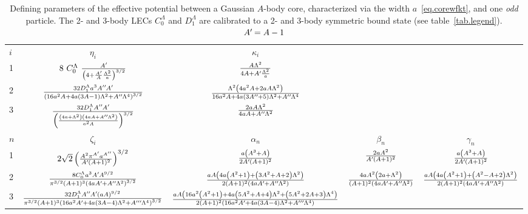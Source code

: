 \documentclass[aps,prd,onecolumn
,tightenlines,letterpaper,
notitlepage,11pt,
nofootinbib]{revtex4-1}
\newcommand*{\mprime}{^{\prime}\mkern-1.2mu}
\newcommand*{\mdprime}{^{\prime\prime}\mkern-1.2mu}
\newcommand*{\mtprime}{^{\prime\prime\prime}\mkern-1.2mu}
\begin{document}
\begin{sidewaystable}
\setlength{\tabcolsep}{4pt}
\renewcommand{\arraystretch}{2.4}
\caption{\label{tab.rgmpot}{Defining parameters of the effective potential between
a Gaussian $A$-body core, characterized via the width $a$~\eqref{eq.corewfkt},
and one {\it odd} particle. The 2- and 3-body LECs $C^\Lambda_0$ and $D^\Lambda_1$ are
calibrated to a 2- and 3-body symmetric bound state (see table~\ref{tab.legend}). $A\mprime=A-1$}}
\small\centering
\begin{tabular}{lc|ccc}
\hline\hline
$i$ & $\eta_i$ & $\kappa_i$ & & \\
1   & $8~C_0^\Lambda~\frac{A\mprime}{\left(4+\frac{A\mprime}{A}\frac{\Lambda^2}{a}\right)^{3/2}}$  & $\frac{A\Lambda^2}{4A+A\mprime\frac{\Lambda^2}{a}}$ \\
2   & $
\frac{32 D_1^\Lambda a^3 A\mdprime A\mprime}{\left(16 a^2 A+4 a (3 A-1) \Lambda ^2+A\mdprime \Lambda ^4\right)^{3/2}}$ & $\frac{\Lambda ^2 \left(4 a^2 A+2 a A \Lambda ^2\right)}{16 a^2 A+4 a (3 A\mdprime+5) \Lambda ^2+A\mdprime \Lambda ^4}$ \\
3 & 
$\frac{32 D_1^\Lambda A\mdprime A\mprime}{\left(\frac{\left(4 a+\Lambda ^2\right) \left(4 a A+A\mdprime \Lambda ^2\right)}{a^2 A}\right)^{3/2}}$ & $\frac{2 a A \Lambda ^2}{4 a A+A\mdprime \Lambda ^2}$ \\
\hline
$n$ & $\zeta_i$ & $\alpha_n$ & $\beta_n$ & $\gamma_n$ \\
1 &$2 \sqrt{2} \left(\frac{A^2 \pi ^{A\mprime} a^{A\mdprime}}{A\mprime (A+1)^2}\right)^{3/2}$&
$\frac{a \left(A^3+A\right)}{2 A\mprime (A+1)^2}$&
$\frac{2 a A^2}{A\mprime (A+1)^2}$&
$\frac{a \left(A^3+A\right)}{2 A\mprime (A+1)^2}$\\
2 & 
$ \frac{8 C_0^\Lambda a^3 A\mprime A^{9/2}}{\pi ^{3/2} (A+1)^3 \left(4 a A\mprime+A\mdprime \Lambda ^2\right)^{3/2}}  $ & 
$\frac{\text{} a A \left(4 a \left(A^2+1\right)+\left(3 A^2+A+2\right) \Lambda ^2\right)}{2 (A+1)^2 \left(4 a A\mprime+A\mdprime \Lambda ^2\right)}$&
$\frac{4 \text{} a A^2 \left(2 a+\Lambda ^2\right)}{(A+1)^2 \left(4 a A\mprime+A\mdprime \Lambda ^2\right)}$&
$\frac{a A \left(4 a \left(A^2+1\right)+\left(A^2-A+2\right) \Lambda ^2\right)}{2 (A+1)^2 \left(4 a A\mprime+A\mdprime \Lambda ^2\right)}$ \\
3 &
$\frac{32 D_1^\Lambda A\mdprime A\mprime (a A)^{9/2}}{\pi ^{3/2} (A+1)^3 \left(16 a^2 A\mprime+4 a (3 A-4) \Lambda ^2+A\mtprime \Lambda ^4\right)^{3/2}}$&
$\frac{\text{} a A \left(16 a^2 \left(A^2+1\right)+4 a \left(5 A^2+A+4\right) \Lambda ^2+\left(5 A^2+2 A+3\right) \Lambda ^4\right)}{2 (A+1)^2 \left(16 a^2 A\mprime+4 a (3 A-4) \Lambda ^2+A\mtprime \Lambda ^4\right)}$&

\end{tabular}
\end{sidewaystable}
\end{document}

